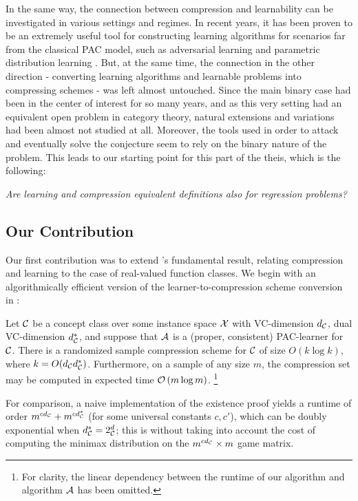 \documentclass[12pt,a4paper,oneside,onecolumn]{book}
\begin{document}
In the same way, the connection between compression and learnability can be investigated in various settings and regimes. In recent years, it has been proven to be an extremely useful tool for constructing learning algorithms for scenarios far from the classical PAC model, such as adversarial learning \citep{DBLP:conf/colt/MontasserHS19} and parametric distribution learning \citet{ashtiani2020near}.
But, at the same time, the connection in the other direction - converting learning algorithms and learnable problems into compressing schemes - was left almost untouched. Since the main binary case had been in the center of interest for so many years, and as this very setting had an equivalent open problem in category theory, natural extensions and variations had been almost not studied at all. Moreover, the tools used in order to attack and eventually solve the conjecture seem to rely on the binary nature of the problem. 
This leads to our starting point for this part of the theis, which is the following:
\begin{question}{\em 
    Are learning and compression equivalent definitions also for regression problems?}
\end{question}

\subsection{Our Contribution}
Our first contribution was to extend \citeauthor{moran2016sample}'s fundamental result, relating compression and learning to the case of real-valued function classes. We begin with an algorithmically efficient version
of the learner-to-compression scheme conversion in
\citet{moran2016sample}:

\begin{theorem}
  \label{thm:classification}
  Let $\mathcal{C}$ be a concept class
  over some instance space $\mathcal{X}$
  with VC-dimension $d_{\mathcal{C}}$, dual VC-dimension $d^*_{\mathcal{C}}$,
  and suppose that $\mathcal{A}$ is a (proper, consistent) PAC-learner for $\mathcal{C}$.
There is
a randomized sample compression scheme for $\mathcal{C}$ of size
$O(k\log k)$, where $k=O(d_{\mathcal{C}}d^*_{\mathcal{C}})$.
Furthermore,
on a sample of any size $m$,
the compression set may be computed in
expected
time $\mathcal{O}\left(m\log m\right)$.
\footnote{For clarity, the linear dependency between the runtime of our algorithm and algorithm $\mathcal{A}$ has been omitted.}
\end{theorem}
For comparison, 
a naive implementation of the
\citet{moran2016sample}
existence proof
yields a runtime of order
$
m^{cd_{\mathcal{C}}}
+
m^{cd^*_{\mathcal{C}}}$
(for some universal constants $c,c'$),
which can be doubly exponential when $d^*_{\mathcal{C}}=2^d_{\mathcal{C}}$;
this is
without taking into account the cost of
computing the minimax distribution on the $m^{cd_{\mathcal{C}}}\times m$
game matrix.
\end{document}
